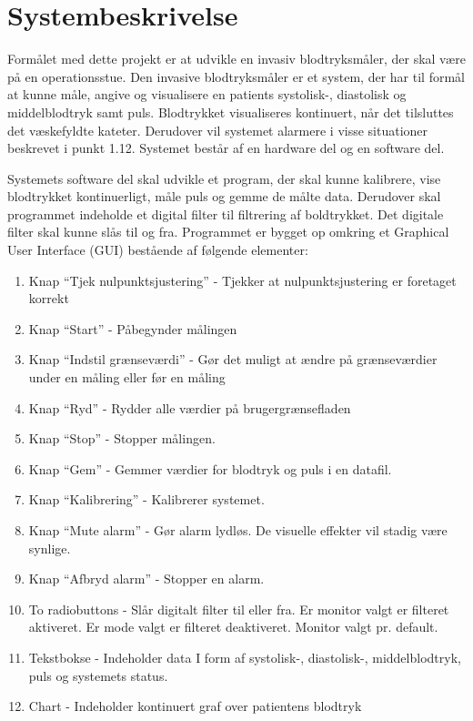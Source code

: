 \chapter{Systembeskrivelse}
Formålet med dette projekt er at udvikle en invasiv blodtryksmåler, der skal være på en operationsstue. Den invasive blodtryksmåler er et system, der har til formål at kunne måle, angive og visualisere en patients systolisk-, diastolisk og middelblodtryk samt puls. Blodtrykket visualiseres kontinuert, når det tilsluttes det væskefyldte kateter. Derudover vil systemet alarmere i visse situationer beskrevet i punkt 1.12.
Systemet består af en hardware del og en software del. 


Systemets software del skal udvikle et program, der skal kunne kalibrere, vise blodtrykket kontinuerligt, måle puls og gemme de målte data. Derudover skal programmet indeholde et digital filter til filtrering af boldtrykket. Det digitale filter skal kunne slås til og fra. Programmet er bygget op omkring et Graphical User Interface (GUI) bestående af følgende elementer:
\vspace{0.7 cm}

\begin{enumerate}[2.1.]
	\item Knap “Tjek nulpunktsjustering” - Tjekker at nulpunktsjustering er foretaget korrekt
	\item Knap “Start” - Påbegynder målingen
	\item Knap “Indstil grænseværdi” - Gør det muligt at ændre på grænseværdier under en måling eller før en måling 
	\item Knap “Ryd” - Rydder alle værdier på brugergrænsefladen
	\item Knap “Stop” - Stopper målingen.
	\item Knap “Gem” - Gemmer værdier for blodtryk og puls i en datafil.
	\item Knap “Kalibrering” - Kalibrerer systemet.
	\item Knap “Mute alarm” - Gør alarm lydløs. De visuelle effekter vil stadig være synlige.
	\item Knap “Afbryd alarm” - Stopper en alarm.
	\item To radiobuttons - Slår digitalt filter til eller fra. Er monitor valgt er filteret aktiveret. Er mode valgt er filteret deaktiveret. Monitor valgt pr. default. 
	\item Tekstbokse - Indeholder data I form af systolisk-, diastolisk-, middelblodtryk, puls og systemets status. 
	\item Chart - Indeholder kontinuert graf over patientens blodtryk
\end{enumerate}


